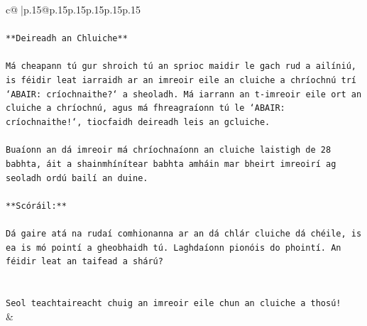 \documentclass{article}
\begin{document}
{\begin{supertabular}{c@{$\;$}|p{.15\linewidth}@{}p{.15\linewidth}p{.15\linewidth}p{.15\linewidth}p{.15\linewidth}p{.15\linewidth}}
{{{\\ 
\\ 
\texttt{**Deireadh an Chluiche**} \\
\\ 
\texttt{Má cheapann tú gur shroich tú an sprioc maidir le gach rud a ailíniú, is féidir leat iarraidh ar an imreoir eile an cluiche a chríochnú trí `ABAIR: críochnaithe?` a sheoladh. Má iarrann an t{-}imreoir eile ort an cluiche a chríochnú, agus má fhreagraíonn tú le `ABAIR: críochnaithe!`, tiocfaidh deireadh leis an gcluiche.} \\
\\ 
\texttt{Buaíonn an dá imreoir má chríochnaíonn an cluiche laistigh de 28 babhta, áit a shainmhínítear babhta amháin mar bheirt imreoirí ag seoladh ordú bailí an duine.} \\
\\ 
\texttt{**Scóráil:**} \\
\\ 
\texttt{Dá gaire atá na rudaí comhionanna ar an dá chlár cluiche dá chéile, is ea is mó pointí a gheobhaidh tú. Laghdaíonn pionóis do phointí. An féidir leat an taifead a shárú?} \\
\\ 
\\ 
\texttt{Seol teachtaireacht chuig an imreoir eile chun an cluiche a thosú!} \\
            }
        }
    }
    & \\ \\


\end{supertabular}}
\end{document}
